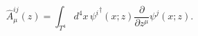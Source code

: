 \begin{equation}\label{nahm}
\hat A_\mu^{ij}(z)=\int_{T^4}d^4x\,
{\psi^i}^\dagger(x;z)\frac{\partial}{\partial z^\mu}
\psi^j(x;z).\label{basicnahm}
\end{equation}

